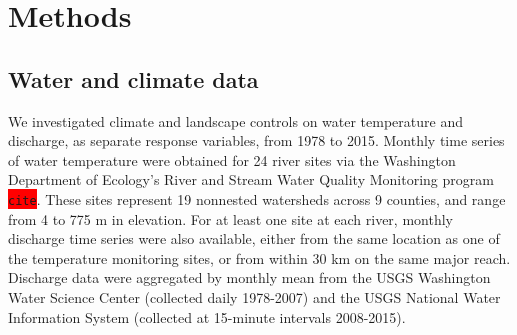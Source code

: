 \documentclass[notitlepage]{article}
\begin{document}
\section*{Methods}



\subsection*{Water and climate data}

We investigated climate and landscape controls on water temperature and discharge, as separate response variables, from 1978 to 2015. Monthly time series of water temperature were obtained for 24 river sites via the Washington Department of Ecology's River and Stream Water Quality Monitoring program \colorbox{red}{\lstinline{cite}}. These sites represent 19 nonnested watersheds across 9 counties, and range from 4 to 775 m in elevation. For at least one site at each river, monthly discharge time series were also available, either from the same location as one of the temperature monitoring sites, or from within 30 km on the same major reach. Discharge data were aggregated by monthly mean from the USGS Washington Water Science Center (collected daily 1978-2007) and the USGS National Water Information System (collected at 15-minute intervals 2008-2015). 
\end{document}
